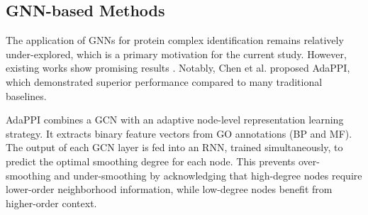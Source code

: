 \subsection{GNN-based Methods}
The application of GNNs for protein complex identification remains relatively under-explored, which is a primary motivation for the current study. However, existing works show promising results \cite{zaki2021identifying}. Notably, Chen et al. \cite{chen2023adappi} proposed AdaPPI, which demonstrated superior performance compared to many traditional baselines.

AdaPPI combines a GCN with an adaptive node-level representation learning strategy. It extracts binary feature vectors from GO annotations (BP and MF). The output of each GCN layer is fed into an RNN, trained simultaneously, to predict the optimal smoothing degree for each node. This prevents over-smoothing and under-smoothing by acknowledging that high-degree nodes require lower-order neighborhood information, while low-degree nodes benefit from higher-order context.


